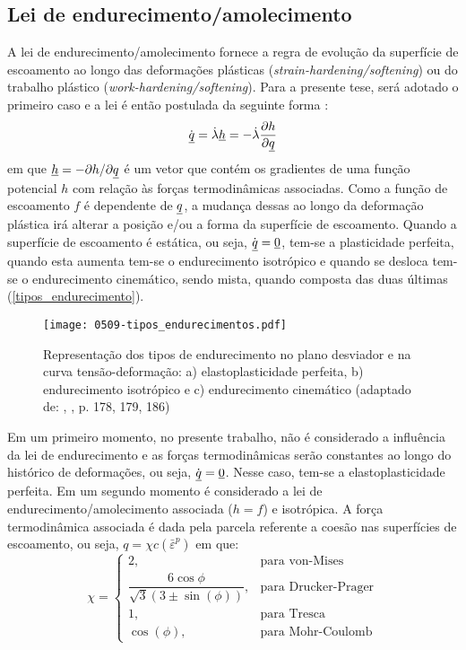 \subsection{Lei de endurecimento/amolecimento}
A lei de endurecimento/amolecimento fornece a regra de evolução da superfície de escoamento ao longo das deformações plásticas (\textit{strain-hardening/softening}) ou do trabalho plástico (\textit{work-hardening/softening}). Para a presente tese, será adotado o primeiro caso e a lei é então postulada da seguinte forma \cite[p. 249]{Belytschko2000}:
\begin{equation}
	\label{eq:amolecimento}
	\dot {\underline q} = \dot \lambda \underline h = - \dot \lambda \dfrac{\partial h}{\partial \underline q}
\end{equation}
em que $\underline h = - \partial h / \partial \underline q$ é um vetor que contém os gradientes de uma função potencial $h$ com relação às forças termodinâmicas associadas. Como a função de escoamento $f$ é dependente de $\underline q$, a mudança dessas ao longo da deformação plástica irá alterar a posição e/ou a forma da superfície de escoamento. Quando a superfície de escoamento é estática, ou seja, $\dot {\underline q}=\underline 0$, tem-se a plasticidade perfeita, quando esta aumenta tem-se o endurecimento isotrópico e quando se desloca tem-se o endurecimento cinemático, sendo mista, quando composta das duas últimas (\autoref{tipos_endurecimento}).

\begin{figure}[H]
	\begin{center}
		\texttt{[image: 0509-tipos\_endurecimentos.pdf]}
	\end{center}
	\caption{\label{tipos_endurecimento}Representação dos tipos de endurecimento no plano desviador e na curva tensão-deformação: a) elastoplasticidade perfeita, b) endurecimento isotrópico e c) endurecimento cinemático (adaptado de: \citeauthor{Neto2008}, \citeyear{Neto2008}, p. 178, 179, 186)}
\end{figure}
Em um primeiro momento, no presente trabalho, não é considerado a influência da lei de endurecimento e as forças termodinâmicas serão constantes ao longo do histórico de deformações, ou seja, $\dot {\underline q} = \underline 0$. Nesse caso, tem-se a elastoplasticidade perfeita. Em um segundo momento é considerado a lei de endurecimento/amolecimento associada ($h = f$) e isotrópica. A força termodinâmica associada é dada pela parcela referente a coesão nas superfícies de escoamento, ou seja, $q = \chi c(\bar \varepsilon^p)$ em que:
\begin{equation}
	\label{eq:dfdc}
	\chi = \left\{ \begin{array}{ll} 
		2, & \text{para von-Mises} \\
		\dfrac{6\cos{\phi}}{\sqrt{3}(3\pm \sin(\phi))}, & \text{para Drucker-Prager} \\ 
		1, & \text{para Tresca}\\
		\cos(\phi), & \text{para Mohr-Coulomb}\end{array}	
	\right.
\end{equation}




